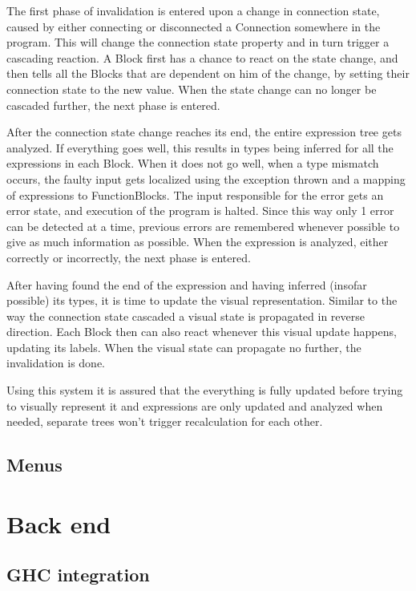 The first phase of invalidation is entered upon a change in connection state, caused by either connecting or disconnected a Connection somewhere in the program. This will change the connection state property and in turn trigger a cascading reaction. A Block first has a chance to react on the state change, and then tells all the Blocks that are dependent on him of the change, by setting their connection state to the new value. When the state change can no longer be cascaded further, the next phase is entered.

After the connection state change reaches its end, the entire expression tree gets analyzed. If everything goes well, this results in types being inferred for all the expressions in each Block. When it does not go well, when a type mismatch occurs, the faulty input gets localized using the exception thrown and a mapping of expressions to FunctionBlocks. The input responsible for the error gets an error state, and execution of the program is halted. Since this way only 1 error can be detected at a time, previous errors are remembered whenever possible to give as much information as possible. When the expression is analyzed, either correctly or incorrectly, the next phase is entered.

After having found the end of the expression and having inferred (insofar possible) its types, it is time to update the visual representation. Similar to the way the connection state cascaded a visual state is propagated in reverse direction. Each Block then can also react whenever this visual update happens, updating its labels. When the visual state can propagate no further, the invalidation is done.

Using this system it is assured that the everything is fully updated before trying to visually represent it and expressions are only updated and analyzed when needed, separate trees won't trigger recalculation for each other.

\subsection{Menus}


\section{Back end}

\subsection{GHC integration}

